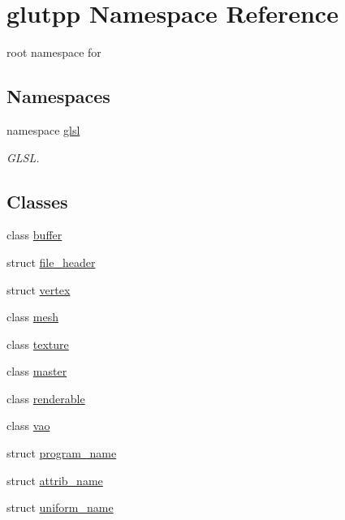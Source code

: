 \hypertarget{namespaceglutpp}{\section{glutpp \-Namespace \-Reference}
\label{namespaceglutpp}
}


root namespace for   


\subsection*{\-Namespaces}
\begin{DoxyCompactItemize}
\item 
namespace \hyperlink{namespaceglutpp_1_1glsl}{glsl}
\begin{DoxyCompactList}\small\item\em \-G\-L\-S\-L. \end{DoxyCompactList}\end{DoxyCompactItemize}
\subsection*{\-Classes}
\begin{DoxyCompactItemize}
\item 
class \hyperlink{classglutpp_1_1buffer}{buffer}
\item 
struct \hyperlink{structglutpp_1_1file__header}{file\-\_\-header}
\item 
struct \hyperlink{structglutpp_1_1vertex}{vertex}
\item 
class \hyperlink{classglutpp_1_1mesh}{mesh}
\item 
class \hyperlink{classglutpp_1_1texture}{texture}
\item 
class \hyperlink{classglutpp_1_1master}{master}
\item 
class \hyperlink{classglutpp_1_1renderable}{renderable}
\item 
class \hyperlink{classglutpp_1_1vao}{vao}
\item 
struct \hyperlink{structglutpp_1_1program__name}{program\-\_\-name}
\item 
struct \hyperlink{structglutpp_1_1attrib__name}{attrib\-\_\-name}
\item 
struct \hyperlink{structglutpp_1_1uniform__name}{uniform\-\_\-name}
\end{DoxyCompactItemize}
